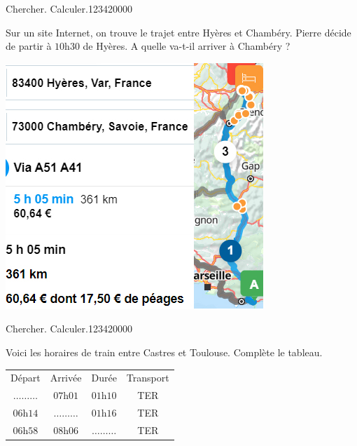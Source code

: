 \begin{pageParcoursd}
\begin{ExoCd}{ Chercher. Calculer.}{1234}{2}{0}{0}{0}{0}
\begin{minipage}{0.62\linewidth}
 Sur un site Internet, on trouve le trajet entre Hyères et Chambéry. Pierre décide de partir à $10$h$30$ de Hyères. A quelle va-t-il arriver à Chambéry ?
\end{minipage}
\hfill 
\begin{minipage}{0.35\linewidth}
  \includegraphics[scale=0.7]{FIG/grandeurs_mesures/via_michelin.jpg} 
\end{minipage}

\end{ExoCd}

\begin{ExoCd}{ Chercher. Calculer.}{1234}{2}{0}{0}{0}{0}
 
 
 Voici les horaires de train entre Castres et Toulouse. Complète le tableau.
 
 \begin{minipage}{0.5\linewidth}

\begin{tabular}{|cccc|}
\hline 
\cellcolor{sacado_violet!20} Départ & \cellcolor{sacado_violet!20} Arrivée & \cellcolor{sacado_violet!20} Durée & \cellcolor{sacado_violet!20} Transport \\ 
   $\ldots \ldots \ldots$ & $07$h$01$ &   $01$h$10$ &  TER \\ 
\cellcolor{sacado_violet!20}$06$h$14$ & \cellcolor{sacado_violet!20}$\ldots \ldots \ldots$ & \cellcolor{sacado_violet!20}$01$h$16$ &\cellcolor{sacado_violet!20} TER \\ 
  $06$h$58$ &   $08$h$06$ &   $\ldots \ldots \ldots$ &   TER \\ 
\hline 
\end{tabular} 





\end{minipage}
\end{ExoCd}
\end{pageParcoursd}
